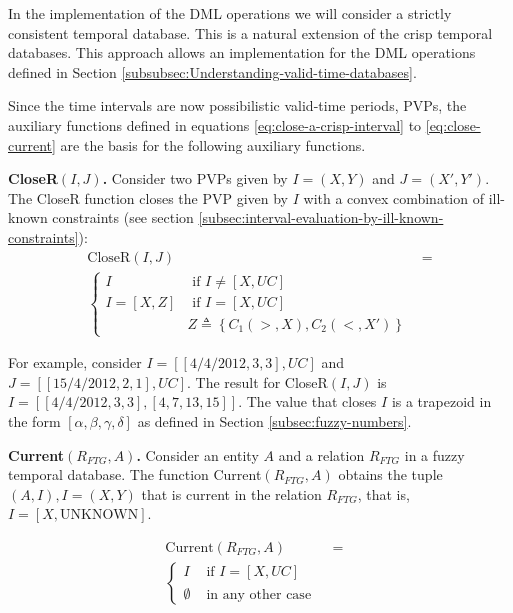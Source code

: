 In the implementation of the DML operations we will consider a strictly consistent temporal database. This is a natural extension of the crisp temporal databases. This approach allows an implementation for the DML operations defined in Section \ref{subsubsec:Understanding-valid-time-databases}.

Since the time intervals are now possibilistic valid-time periods, PVPs, the auxiliary functions defined in equations \eqref{eq:close-a-crisp-interval} to \eqref{eq:close-current} are the basis for the following auxiliary functions.

\begin{definition}
\label{def:close-r-a-pvp}
\textbf{CloseR$\left(I, J\right)$.}
Consider two PVPs given by $I = \left(X, Y \right)$ and $J = \left(X', Y' \right)$. The CloseR function closes the PVP given by $I$ with a convex combination of ill-known constraints (see section \ref{subsec:interval-evaluation-by-ill-known-constraints}):
\begin{align}
\label{eq:close-r-a-pvp}
\text{CloseR}\left(I, J\right) &= \\
\begin{cases}
\nonumber
I   & \mbox{ if } I \neq \left[X, UC \right] \\
I = \left[X, Z \right] & \mbox{ if } I = \left[X, UC \right] \\
& Z \triangleq \left \lbrace C_1\left(>, X \right), C_2\left(<, X' \right) \right \rbrace
\end{cases}
\end{align}
\end{definition}

For example, consider $I = \left[\left[4/4/2012, 3, 3\right] , UC\right]$ and $J = \left[ \left[15/4/2012,2,1\right], UC\right]$. The result for CloseR$\left(I, J\right)$  is $I = \left[ \left[4/4/2012, 3, 3\right], \left[4,7,13,15 \right] \right]$. The value that closes $I$ is a trapezoid in the form $\left[ \alpha, \beta, \gamma, \delta \right]$ as defined in Section \ref{subsec:fuzzy-numbers}.

\begin{definition}
\label{def:pvp-current-in-relation}
\textbf{Current$\left(R_{FTG}, A \right)$.}
Consider an entity $A$ and a relation $R_{FTG}$ in a fuzzy temporal database. The function Current$\left(R_{FTG}, A \right)$ obtains the tuple $\left(A, I \right), I = \left(X, Y \right)$ that is current in the relation $R_{FTG}$, that is, $I = \left[X , \text{UNKNOWN} \right]$.

\begin{align}
\label{eq:pvp-current-in-relation}
\mbox{Current} \left(R_{FTG}, A \right) &=& \\ 
\begin{cases}
\nonumber
I & \mbox{ if } I = \left[X, UC \right] \\
\emptyset & \mbox{ in any other case }
\end{cases}
\end{align}
\end{definition}

